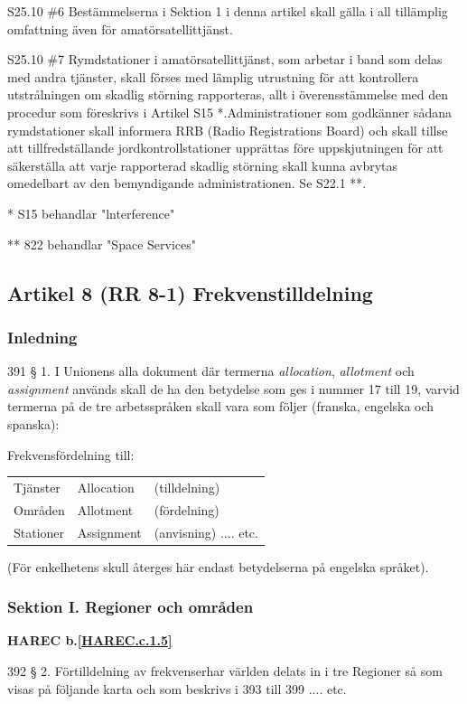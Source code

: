 S25.10 \#6 Bestämmelserna i Sektion 1 i denna artikel skall gälla i all
tillämplig omfattning även för amatörsatellittjänst.

S25.10 \#7 Rymdstationer i amatörsatellittjänst, som arbetar i band som
delas med andra tjänster, skall förses med lämplig utrustning för att
kontrollera utstrålningen om skadlig störning rapporteras, allt i
överensstämmelse med den procedur som föreskrivs i Artikel S15
*.Administrationer som godkänner sådana rymdstationer skall informera
RRB (Radio Registrations Board) och skall tillse att tillfredställande
jordkontrollstationer upprättas före uppskjutningen för att
säkerställa att varje rapporterad skadlig störning skall kunna
avbrytas omedelbart av den bemyndigande administrationen. Se S22.1 **.

* S15 behandlar "lnterference"

** 822 behandlar "Space Services"

\subsection{Artikel 8 (RR 8-1) Frekvenstilldelning}

\subsubsection{Inledning}

391 § 1. I Unionens alla dokument där termerna \emph{allocation},
\emph{allotment} och \emph{assignment} används skall de ha den
betydelse som ges i nummer 17 till 19, varvid termerna på de tre
arbetsspråken skall vara som följer (franska, engelska och spanska):

Frekvensfördelning till:
\begin{tabular}{lll}
  Tjänster & Allocation & (tilldelning) \\
  Områden & Allotment & (fördelning) \\
  Stationer & Assignment & (anvisning) .... etc. \\
\end{tabular}
(För enkelhetens skull återges här endast
betydelserna på engelska språket).

\subsubsection{Sektion I. Regioner och områden}
\textbf{
HAREC b.\ref{HAREC.c.1.5}\label{myHAREC.c.1.5}
}

392 § 2. Förtilldelning av frekvenserhar världen delats in i tre
Regioner så som visas på följande karta och som beskrivs i 393 till
399 .... etc.

